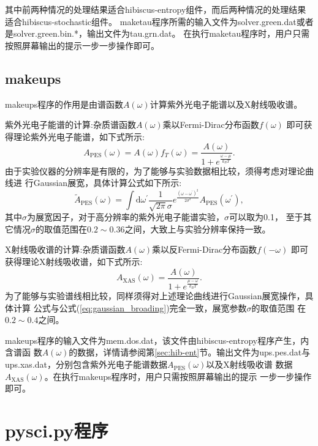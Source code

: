 其中前两种情况的处理结果适合hibiscus-entropy组件，而后两种情况的处理结果适合hibiscus-stochastic组件。
maketau程序所需的输入文件为solver.green.dat或者是solver.green.bin.*，输出文件为tau.grn.dat。
在执行maketau程序时，用户只需按照屏幕输出的提示一步一步操作即可。

\subsection{makeups}
makeups程序的作用是由谱函数$A(\omega)$计算紫外光电子能谱以及X射线吸收谱。

紫外光电子能谱的计算:杂质谱函数$A(\omega)$乘以Fermi-Dirac分布函数$f(\omega)$
即可获得理论紫外光电子能谱，如下式所示:
\begin{equation}
A_{\text{PES}}(\omega) = A(\omega) f_{T}(\omega) 
= \frac{A(\omega)}{ 1 + e^{\frac{\omega - \mu}{k_{B}T}}}.
\end{equation}
由于实验仪器的分辨率是有限的，为了能够与实验数据相比较，须得考虑对理论曲线进
行Gaussian展宽，具体计算公式如下所示:
\begin{equation}
\label{eq:gaussian_broading}
\tilde{A}_{\text{PES}}(\omega) = \int \text{d}\omega^{\prime} 
\frac{1}{\sqrt{2\pi}\sigma} 
e^{\frac{(\omega - \omega^{\prime})^{2}}{2\sigma^{2}}} 
A_{\text{PES}}(\omega^{\prime}),
\end{equation}
其中$\sigma$为展宽因子，对于高分辨率的紫外光电子能谱实验，$\sigma$可以取为0.1，
至于其它情况$\sigma$的取值范围在$0.2\sim 0.36$之间，大致上与实验分辨率保持一致。

X射线吸收谱的计算:杂质谱函数$A(\omega)$乘以反Fermi-Dirac分布函数$f(-\omega)$
即可获得理论X射线吸收谱，如下式所示:
\begin{equation}
A_{\text{XAS}}(\omega) = \frac{A(\omega)}{ 1 + e^{\frac{\mu - \omega}{k_{B}T}}}.
\end{equation}
为了能够与实验谱线相比较，同样须得对上述理论曲线进行Gaussian展宽操作，具体计算
公式与公式(\ref{eq:gaussian_broading})完全一致，展宽参数$\sigma$的取值范围
在$0.2 \sim 0.4$之间。

makeups程序的输入文件为mem.dos.dat，该文件由hibiscus-entropy程序产生，内含谱函
数$A(\omega)$的数据，详情请参阅第\ref{sec:hib-ent}节。输出文件为ups.pes.dat与
ups.xas.dat，分别包含紫外光电子能谱数据$A_{\text{PES}}(\omega)$以及X射线吸收谱
数据$A_{\text{XAS}}(\omega)$。在执行makeups程序时，用户只需按照屏幕输出的提示
一步一步操作即可。

\section{pysci.py程序}
\label{sec:pysci}

